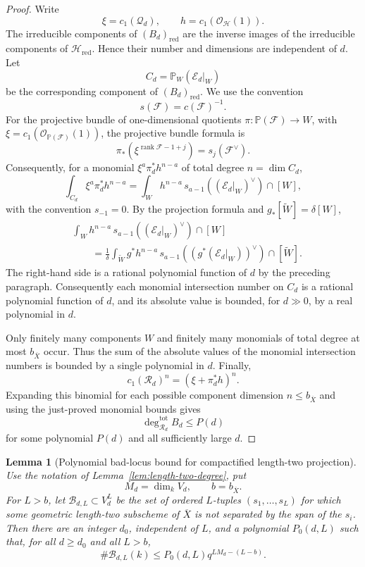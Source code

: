\documentclass{lms}
\newtheorem{lemma}[theorem]{Lemma}
\newcommand{\PP}{\mathbb P}
\newcommand{\OO}{\mathcal O}
\newcommand{\barX}{\overline{X}}
\begin{document}
\begin{proof}
Write
\[
        \xi=c_1(\mathcal Q_d),
        \qquad
        h=c_1(\OO_{\mathcal H}(1)).
\]
The irreducible components of $(B_d)_{\mathrm{red}}$ are the inverse images of the irreducible components of $\mathcal H_{\mathrm{red}}$.  Hence their number and dimensions are independent of $d$.  Let
\[
        C_d=\PP_W(\mathcal E_d|_W)
\]
be the corresponding component of $(B_d)_{\mathrm{red}}$.  We use the convention
\[
        s(\mathcal F)=c(\mathcal F)^{-1}.
\]
For the projective bundle of one-dimensional quotients $\pi:\PP(\mathcal F)\to W$, with $\xi=c_1(\OO_{\PP(\mathcal F)}(1))$, the projective bundle formula is
\[
        \pi_*(\xi^{\operatorname{rank}\mathcal F-1+j})=s_j(\mathcal F^\vee).
\]
Consequently, for a monomial $\xi^a\pi_d^*h^{n-a}$ of total degree $n=\dim C_d$,
\[
        \int_{C_d}\xi^a\pi_d^*h^{n-a}
        =
        \int_W h^{n-a}\,s_{a-1}((\mathcal E_d|_W)^\vee)\cap[W],
\]
with the convention $s_{-1}=0$.  By the projection formula and $g_*[\widetilde W]=\delta[W]$,
\[
\begin{aligned}
        &\int_W h^{n-a}\,s_{a-1}((\mathcal E_d|_W)^\vee)\cap[W] \\
        &\qquad=
        \frac1\delta
        \int_{\widetilde W}g^*h^{n-a}\,
        s_{a-1}((g^*(\mathcal E_d|_W))^\vee)\cap[\widetilde W].
\end{aligned}
\]
The right-hand side is a rational polynomial function of $d$ by the preceding paragraph.  Consequently each monomial intersection number on $C_d$ is a rational polynomial function of $d$, and its absolute value is bounded, for $d\gg0$, by a real polynomial in $d$.

Only finitely many components $W$ and finitely many monomials of total degree at most $b_{\barX}$ occur.  Thus the sum of the absolute values of the monomial intersection numbers is bounded by a single polynomial in $d$.  Finally,
\[
        c_1(\mathcal R_d)^n=(\xi+\pi_d^*h)^n.
\]
Expanding this binomial for each possible component dimension $n\le b_{\barX}$ and using the just-proved monomial bounds gives
\[
        \deg^{\mathrm{tot}}_{\mathcal R_d}B_d\le P(d)
\]
for some polynomial $P(d)$ and all sufficiently large $d$.
\end{proof}


\begin{lemma}[Polynomial bad-locus bound for compactified length-two projection]\label{lem:length-two-bad-locus}
Use the notation of Lemma~\ref{lem:length-two-degree}, put
\[
        M_d=\dim_k V_d,
        \qquad
        b=b_{\barX}.
\]
For $L>b$, let $\mathcal B_{d,L}\subset V_d^L$ be the set of ordered $L$-tuples $(s_1,\ldots,s_L)$ for which some geometric length-two subscheme of $\barX$ is not separated by the span of the $s_i$.  Then there are an integer $d_0$, independent of $L$, and a polynomial $P_0(d,L)$ such that, for all $d\ge d_0$ and all $L>b$,
\[
        \#\mathcal B_{d,L}(k)
        \le
        P_0(d,L)q^{LM_d-(L-b)}.
\]
\end{lemma}
\end{document}
